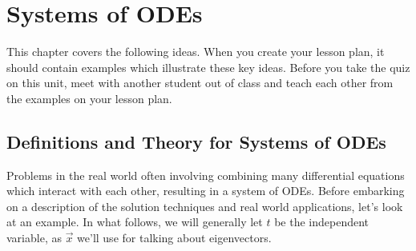 %
\chapter{Systems of ODEs}

This chapter covers the following ideas. When you create your lesson plan, it should contain examples which illustrate these key ideas. Before you take the quiz on this unit, meet with another student out of class and teach each other from the examples on your lesson plan. 





\section{Definitions and Theory for Systems of ODEs}
Problems in the real world often involving combining many differential equations which interact with each other, resulting in a system of ODEs. Before embarking on a description of the solution techniques and real world applications, let's look at an example. In what follows, we will generally let $t$ be the independent variable, as $\vec x$ we'll use for talking about eigenvectors. 

